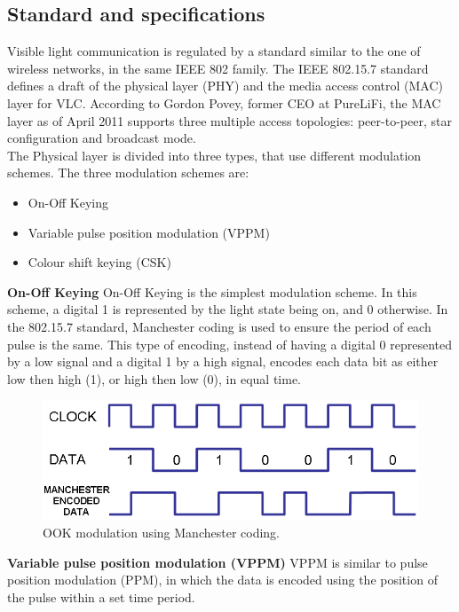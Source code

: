 \subsection{Standard and specifications}
\label{modulschemes}
Visible light communication is regulated by a standard similar to the one of wireless networks, in the same IEEE 802 family.\cite{IEEE}
The IEEE 802.15.7 standard defines a draft of the physical layer (PHY) and the media access control (MAC) layer for VLC. 
According to Gordon Povey, former CEO at PureLiFi\cite{poveyspec}, the MAC layer as of April 2011 supports three multiple access topologies: peer-to-peer, star configuration and broadcast mode.\\
The Physical layer is divided into three types, that use different modulation schemes.
The three modulation schemes are: 
\begin{itemize}
\item On-Off Keying
\item Variable pulse position modulation (VPPM)
\item Colour shift keying (CSK)
\end{itemize}
\textbf{On-Off Keying}\newline
On-Off Keying is the simplest modulation scheme. 
In this scheme, a digital 1 is represented by the light state being on, and 0 otherwise.
In the 802.15.7 standard, Manchester coding is used to ensure the period of each pulse is the same.
This type of encoding, instead of having a digital 0 represented by a low signal and a digital 1 by a high signal, encodes each data bit as either low then high (1), or high then low (0), in equal time.\\
\newline
\begin{figure}[H]
\centering
\includegraphics[scale=0.3]{img/ookmodulation}
\caption{OOK modulation using Manchester coding.}
\label{fig:ookmod}
\end{figure}
\textbf{Variable pulse position modulation (VPPM)}\newline
VPPM is similar to pulse position modulation (PPM), in which the data is encoded using the position of the pulse within a set time period.
